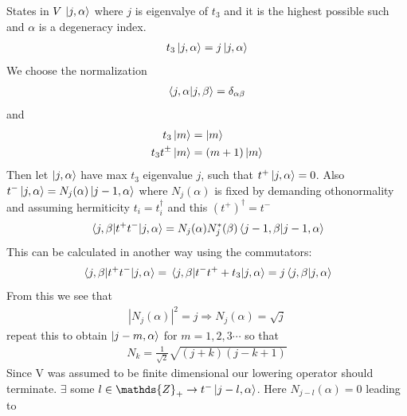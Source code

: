 \documentclass[a4paper,12pt]{article}
\begin{document}
States in $V\,\ket{j,\alpha}$ where $j$ is eigenvalye of $t_3$ and it is the highest possible such and $\alpha$ is a degeneracy index.
\begin{equation}
	\begin{aligned}
		t_3\ket{j,\alpha}=j\ket{j,\alpha}
	\end{aligned}
\end{equation}
We choose the normalization
\begin{equation}
	\begin{aligned}
		\braket{j,\alpha}{j,\beta}=\delta_{\alpha\beta}
	\end{aligned}
\end{equation}
and
\begin{equation}
	\begin{aligned}
		t_3\ket{m}&= \ket{m}\\
		t_3 t^\pm \ket{m}&=(m+1)\ket{m}
	\end{aligned}
\end{equation}
Then let $\ket{j,\alpha}$ have max $t_3$ eigenvalue $j$, such that
$t^+\ket{j,\alpha}=0$. Also $t^-\ket{j,\alpha}=N_j(\alpha)\ket{j-1,\alpha}$ where $N_j(\alpha)$ is fixed by demanding othonormality and assuming hermiticity $t_i=t_i^\dagger$ and this $(t^+)^\dagger=t^-$
\begin{equation}
	\begin{aligned}
		\mel{j,\beta}{t^+t^-}{j,\alpha}=N_j(\alpha)N_j^*(\beta)\braket{j-1,\beta}{j-1,\alpha}
	\end{aligned}
\end{equation}
This can be calculated in another way using the commutators:
\begin{equation}
	\begin{aligned}
		\mel{j,\beta}{t^+t^-}{j,\alpha}=\mel{j,\beta}{t^-t^++t_3}{j,\alpha}=j\braket{j,\beta}{j,\alpha}
	\end{aligned}
\end{equation}
From this we see that
\begin{equation}
	\begin{aligned}
		|N_j(\alpha)|^2=j\Rightarrow N_j(\alpha)=\sqrt{j}
	\end{aligned}
\end{equation}
repeat this to obtain $\ket{j-m,\alpha}$ for $m=1,2,3\cdots$ so that
\begin{equation}
	\begin{aligned}
		N_k=\frac{1}{\sqrt{2}}\sqrt{(j+k)(j-k+1)}
	\end{aligned}
\end{equation}
Since V was assumed to be finite dimensional our lowering operator should terminate. $\exists$ some $l\in \mathds{Z}_+\to t^-\ket{j-l,\alpha}$. Here $N_{j-l}(\alpha)=0$ leading to
\end{document}
